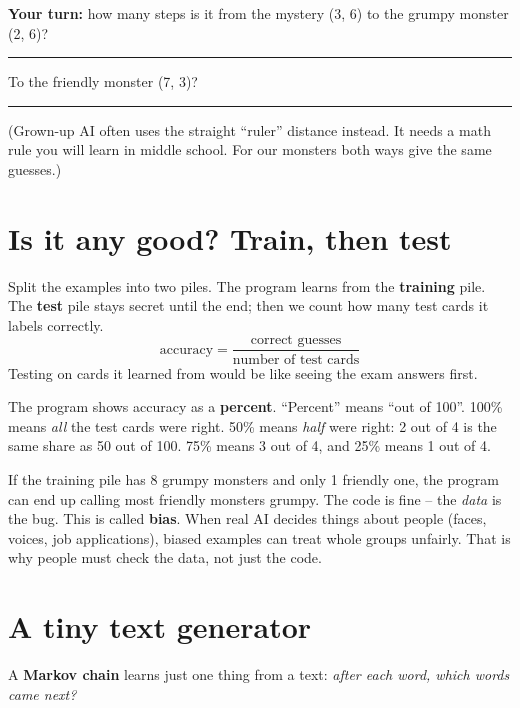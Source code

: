 \textbf{Your turn:} how many steps is it from the mystery (3, 6) to the grumpy monster (2, 6)? \rule{1cm}{0.4pt} \quad To the friendly monster (7, 3)? \rule{1cm}{0.4pt}

(Grown-up AI often uses the straight \enquote{ruler} distance instead. It needs a math rule you will learn in middle school. For our monsters both ways give the same guesses.)

\section{Is it any good? Train, then test}
Split the examples into two piles. The program learns from the \textbf{training} pile. The \textbf{test} pile stays secret until the end; then we count how many test cards it labels correctly.
\[ \text{accuracy} = \frac{\text{correct guesses}}{\text{number of test cards}} \]
Testing on cards it learned from would be like seeing the exam answers first.

\begin{tip}
The program shows accuracy as a \textbf{percent}. \enquote{Percent} means \enquote{out of 100}. 100\% means \emph{all} the test cards were right. 50\% means \emph{half} were right: 2 out of 4 is the same share as 50 out of 100. 75\% means 3 out of 4, and 25\% means 1 out of 4.
\end{tip}

\begin{bughunt}
If the training pile has 8 grumpy monsters and only 1 friendly one, the program can end up calling most friendly monsters grumpy. The code is fine -- the \emph{data} is the bug. This is called \textbf{bias}. When real AI decides things about people (faces, voices, job applications), biased examples can treat whole groups unfairly. That is why people must check the data, not just the code.
\end{bughunt}

\section{A tiny text generator}
A \textbf{Markov chain} learns just one thing from a text: \emph{after each word, which words came next?}

